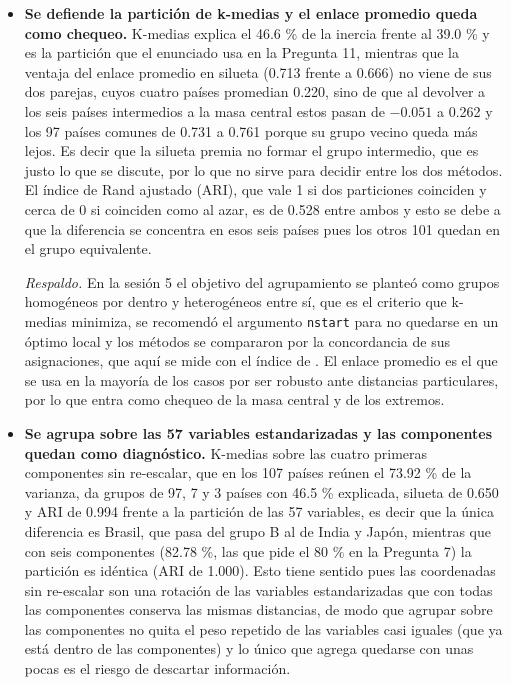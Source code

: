\documentclass[oneside, openany, fontset=libertinus]{mitthesis}
\begin{document}
\begin{notas}
\begin{itemize}
  \emph{Respaldo.} \textcite[cap.~2]{kaufman1990} leen una silueta media
  de 0.25 o menos como ausencia de estructura sustancial y en la sesión
  5 se mostró que un punto que queda entre dos grupos es el caso en que
  un método suave le asignaría una probabilidad cercana a 0.5 de
  pertenecer a cada uno.
\item
  \textbf{Se defiende la partición de k-medias y el enlace promedio
  queda como chequeo.} K-medias explica el 46.6 \% de la inercia frente
  al 39.0 \% y es la partición que el enunciado usa en la Pregunta 11,
  mientras que la ventaja del enlace promedio en silueta (0.713 frente a
  0.666) no viene de sus dos parejas, cuyos cuatro países promedian
  0.220, sino de que al devolver a los seis países intermedios a la masa
  central estos pasan de \(-0.051\) a 0.262 y los 97 países comunes de
  0.731 a 0.761 porque su grupo vecino queda más lejos. Es decir que la
  silueta premia no formar el grupo intermedio, que es justo lo que se
  discute, por lo que no sirve para decidir entre los dos métodos. El
  índice de Rand ajustado (ARI), que vale 1 si dos particiones coinciden
  y cerca de 0 si coinciden como al azar, es de 0.528 entre ambos y esto
  se debe a que la diferencia se concentra en esos seis países pues los
  otros 101 quedan en el grupo equivalente.

  \emph{Respaldo.} En la sesión 5 el objetivo del agrupamiento se
  planteó como grupos homogéneos por dentro y heterogéneos entre sí, que
  es el criterio que k-medias minimiza, se recomendó el argumento
  \texttt{nstart} para no quedarse en un óptimo local y los métodos se
  compararon por la concordancia de sus asignaciones, que aquí se mide
  con el índice de \textcite{hubert1985}. El enlace promedio es el que
  se usa en la mayoría de los casos por ser robusto ante distancias
  particulares, por lo que entra como chequeo de la masa central y de
  los extremos.
\item
  \textbf{Se agrupa sobre las 57 variables estandarizadas y las
  componentes quedan como diagnóstico.} K-medias sobre las cuatro
  primeras componentes sin re-escalar, que en los 107 países reúnen el
  73.92 \% de la varianza, da grupos de 97, 7 y 3 países con 46.5 \%
  explicada, silueta de 0.650 y ARI de 0.994 frente a la partición de
  las 57 variables, es decir que la única diferencia es Brasil, que pasa
  del grupo B al de India y Japón, mientras que con seis componentes
  (82.78 \%, las que pide el 80 \% en la Pregunta 7) la partición es
  idéntica (ARI de 1.000). Esto tiene sentido pues las coordenadas sin
  re-escalar son una rotación de las variables estandarizadas que con
  todas las componentes conserva las mismas distancias, de modo que
  agrupar sobre las componentes no quita el peso repetido de las
  variables casi iguales (que ya está dentro de las componentes) y lo
  único que agrega quedarse con unas pocas es el riesgo de descartar
  información.


\end{itemize}
\end{notas}
\end{document}
